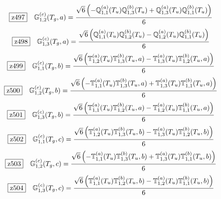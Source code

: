 \documentclass[fleqn,10pt,landscape]{jsarticle}
\begin{document}
\begin{dmath*}
\hspace*{3mm}\fbox{z497}\quad \mathbb{G}_{1,2}^{(c)}(T_{g},a)=\frac{\sqrt{6} \left(- \mathbb{Q}_{1,1}^{(a)}(T_{u}) \mathbb{Q}_{1,3}^{(b)}(T_{u}) + \mathbb{Q}_{1,3}^{(a)}(T_{u}) \mathbb{Q}_{1,1}^{(b)}(T_{u})\right)}{6}
\end{dmath*}
\begin{dmath*}
\hspace*{3mm}\fbox{z498}\quad \mathbb{G}_{1,3}^{(c)}(T_{g},a)=\frac{\sqrt{6} \left(\mathbb{Q}_{1,1}^{(a)}(T_{u}) \mathbb{Q}_{1,2}^{(b)}(T_{u}) - \mathbb{Q}_{1,2}^{(a)}(T_{u}) \mathbb{Q}_{1,1}^{(b)}(T_{u})\right)}{6}
\end{dmath*}
\begin{dmath*}
\hspace*{3mm}\fbox{z499}\quad \mathbb{G}_{1,1}^{(c)}(T_{g},b)=\frac{\sqrt{6} \left(\mathbb{T}_{1,2}^{(a)}(T_{u}) \mathbb{T}_{1,3}^{(b)}(T_{u},a) - \mathbb{T}_{1,3}^{(a)}(T_{u}) \mathbb{T}_{1,2}^{(b)}(T_{u},a)\right)}{6}
\end{dmath*}
\begin{dmath*}
\hspace*{3mm}\fbox{z500}\quad \mathbb{G}_{1,2}^{(c)}(T_{g},b)=\frac{\sqrt{6} \left(- \mathbb{T}_{1,1}^{(a)}(T_{u}) \mathbb{T}_{1,3}^{(b)}(T_{u},a) + \mathbb{T}_{1,3}^{(a)}(T_{u}) \mathbb{T}_{1,1}^{(b)}(T_{u},a)\right)}{6}
\end{dmath*}
\begin{dmath*}
\hspace*{3mm}\fbox{z501}\quad \mathbb{G}_{1,3}^{(c)}(T_{g},b)=\frac{\sqrt{6} \left(\mathbb{T}_{1,1}^{(a)}(T_{u}) \mathbb{T}_{1,2}^{(b)}(T_{u},a) - \mathbb{T}_{1,2}^{(a)}(T_{u}) \mathbb{T}_{1,1}^{(b)}(T_{u},a)\right)}{6}
\end{dmath*}
\begin{dmath*}
\hspace*{3mm}\fbox{z502}\quad \mathbb{G}_{1,1}^{(c)}(T_{g},c)=\frac{\sqrt{6} \left(\mathbb{T}_{1,2}^{(a)}(T_{u}) \mathbb{T}_{1,3}^{(b)}(T_{u},b) - \mathbb{T}_{1,3}^{(a)}(T_{u}) \mathbb{T}_{1,2}^{(b)}(T_{u},b)\right)}{6}
\end{dmath*}
\begin{dmath*}
\hspace*{3mm}\fbox{z503}\quad \mathbb{G}_{1,2}^{(c)}(T_{g},c)=\frac{\sqrt{6} \left(- \mathbb{T}_{1,1}^{(a)}(T_{u}) \mathbb{T}_{1,3}^{(b)}(T_{u},b) + \mathbb{T}_{1,3}^{(a)}(T_{u}) \mathbb{T}_{1,1}^{(b)}(T_{u},b)\right)}{6}
\end{dmath*}
\begin{dmath*}
\hspace*{3mm}\fbox{z504}\quad \mathbb{G}_{1,3}^{(c)}(T_{g},c)=\frac{\sqrt{6} \left(\mathbb{T}_{1,1}^{(a)}(T_{u}) \mathbb{T}_{1,2}^{(b)}(T_{u},b) - \mathbb{T}_{1,2}^{(a)}(T_{u}) \mathbb{T}_{1,1}^{(b)}(T_{u},b)\right)}{6}
\end{dmath*}
\end{document}
